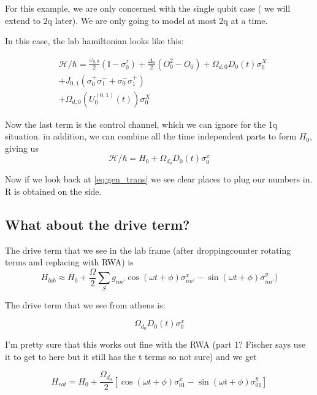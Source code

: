 \documentclass[12pt]{article}
\begin{document}
For this example, we are only concerned with the single qubit case ( we will extend to 2q later). We are only going to model at most 2q at a time.

In this case, the lab hamiltonian looks like this:

\begin{align} \label{eq:athens_singleq}
         & \mathcal{H}/\hbar = \frac{\omega_{q,0}}{2}(\mathbb{I}-\sigma_0^{z})+\frac{\Delta_{0}}{2}(O_0^2-O_0)+\Omega_{d,0}D_0(t)\sigma_0^{X}\\
         & + J_{0,1}(\sigma_{0}^{+}\sigma_{1}^{-}+\sigma_{0}^{-}\sigma_{1}^{+}) \\
         & + \Omega_{d,0}(U_{0}^{(0,1)}(t))\sigma_{0}^{X}
\end{align}

Now the last term is the control channel, which we can ignore for the 1q situation.
in addition, we can combine all the time independent parts to form $H_0$, giving us 
\begin{equation}
         \mathcal{H}/ \hbar = H_0 + \Omega_{d_0} D_0(t) \sigma_0^x
\end{equation}

Now if we look back at \eqref{eq:gen_trans} we see clear places to plug our numbers in. R
is obtained on the side.
\subsection{What about the drive term?}
The drive term that we see in the lab frame (after droppingcounter rotating
terms and replacing with RWA) is 
\begin{equation}
        H_{lab} \approx H_0 + \frac{\Omega}{2} \sum_S g_{nn'} \cos(\omega t + \phi)\sigma^x_{nn'} - \sin(\omega t + \phi)\sigma^y_{nn'})
\end{equation}

The drive term that we see from athens is:

\begin{equation}
        \Omega_{d_0} D_0(t) \sigma_0^x
\end{equation}


I'm pretty sure that this works out fine with the RWA (part 1? Fischer says use it to get to here but it still has the t terms so not sure) and we get 

\begin{equation}
        H_{rot} = H_0 + \frac{\Omega_{d_0}}{2} \left[ \cos(\omega t + \phi)\sigma^x_{01} - \sin(\omega t + \phi)\sigma^y_{01} \right]
\end{equation}
\end{document}

